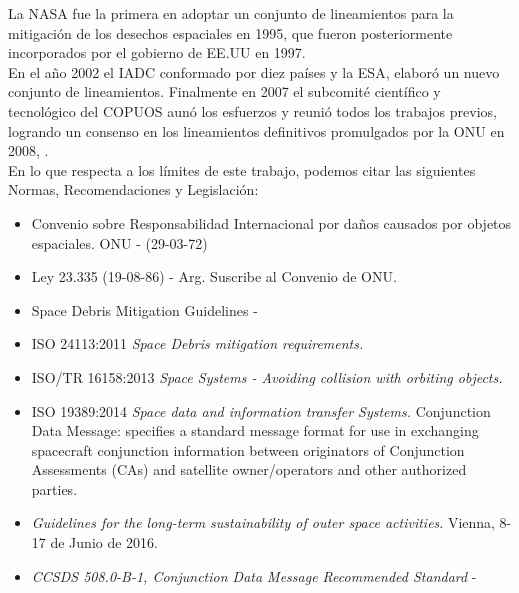 La NASA fue la primera en adoptar un conjunto de lineamientos para la mitigaci\'on de los desechos espaciales en 1995, que fueron posteriormente incorporados por el gobierno de EE.UU en 1997. \\

En el a\~no 2002 el IADC conformado por diez pa\'ises y la ESA, elabor\'o un nuevo conjunto de lineamientos.
Finalmente en 2007 el subcomit\'e cient\'ifico y tecnol\'ogico del COPUOS aun\'o los esfuerzos y reuni\'o todos los trabajos previos, logrando un consenso en los lineamientos definitivos promulgados por la ONU en 2008, \citep{nasaprogramme}.\\

En lo que respecta a los l\'imites de este trabajo, podemos citar las siguientes Normas, Recomendaciones y Legislaci\'on:\\

\begin{itemize} 
\item Convenio sobre Responsabilidad Internacional por da\~nos causados por objetos espaciales. ONU - (29-03-72)
\item Ley 23.335 (19-08-86) - Arg. Suscribe al Convenio de ONU.
\item Space Debris Mitigation Guidelines - \citep{iadcguide}
\item ISO 24113:2011 {\it{Space Debris mitigation requirements.}}
\item ISO/TR 16158:2013 {\it{Space Systems - Avoiding collision with orbiting objects.}}
\item ISO 19389:2014 {\it{Space data and information transfer Systems.}} Conjunction Data Message: specifies a standard message format for use in exchanging spacecraft conjunction information between originators of Conjunction Assessments (CAs) and satellite owner/operators and other authorized parties.
\item {\it{Guidelines for the long-term sustainability of outer space activities}}. Vienna, 8-17 de Junio de 2016.
\item {\it{CCSDS 508.0-B-1, Conjunction Data Message Recommended Standard}} - \citep{CDM}
\end{itemize}

